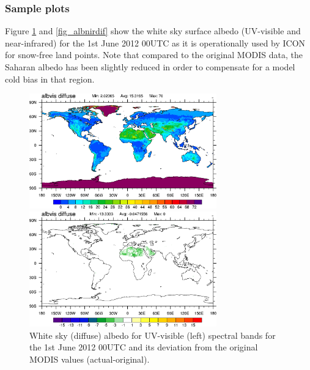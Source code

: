 \documentclass[a4paper,11pt]{article}
\begin{document}
\subsubsection{Sample plots}
Figure \ref{fig_albvisdif} and \ref{fig_albnirdif} show the white sky surface albedo (UV-visible and near-infrared) for the 1st June 2012 00UTC as it is 
operationally used by ICON for snow-free land points. Note that compared to the original MODIS data, the Saharan albedo has been slightly reduced in order 
to compensate for a model cold bias in that region.
\begin{figure}[ht]
\begin{minipage}[t]{\textwidth}
  \begin{minipage}[t]{0.498\textwidth}
    \center
    \includegraphics[width=8.1cm]{albvisdif_20120601_tuned.png}
  \end{minipage}
  \begin{minipage}[t]{0.498\textwidth}
    \center
    \includegraphics[width=8.1cm]{albvisdif_20120601_tuned-untuned.png}
  \end{minipage}
\end{minipage}
\caption{White sky (diffuse) albedo for UV-visible (left) spectral bands for the 1st June 2012 00UTC and its deviation from the original MODIS values (actual-original).}\label{fig_albvisdif}
\end{figure}
\end{document}
